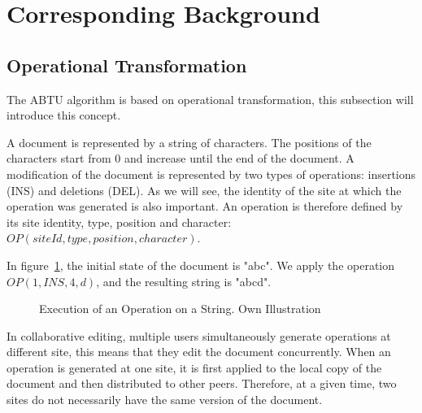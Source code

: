 \documentclass[11pt, a4paper, oneside, openright]{article} %
\begin{document}
\section{Corresponding Background}
\label{sec:background}

\subsection{Operational Transformation}
\label{subsec:optransform}

The ABTU algorithm is based on operational transformation, this subsection will introduce this concept.

A document is represented by a string of characters. The positions of the characters start from 0 and increase until the end of the document. A modification of the document is represented by two types of operations: insertions (INS) and deletions (DEL). As we will see, the identity of the site at which the operation was generated is also important. An operation is therefore defined by its site identity, type, position and character: $OP(siteId, type, position, character)$.

In figure~\ref{fig:simpleOp}, the initial state of the document is "abc". We apply the operation $OP(1, INS, 4, d)$, and the resulting string is "abcd".

\begin{figure}[h]
\begin{center}
\end{center}
\caption{Execution of an Operation on a String. Own Illustration\label{fig:simpleOp}}
\end{figure}

In collaborative editing, multiple users simultaneously generate operations at different site, this means that they edit the document concurrently. When an operation is generated at one site, it is first applied to the local copy of the document and then distributed to other peers. Therefore, at a given time, two sites do not necessarily have the same version of the document.
\end{document}
